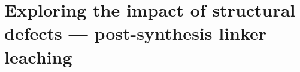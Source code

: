 
\graphicspath{ {\thisch/figures/} }

\chapter{Exploring the impact of structural defects --- post-synthesis linker leaching}%
\label{def}








